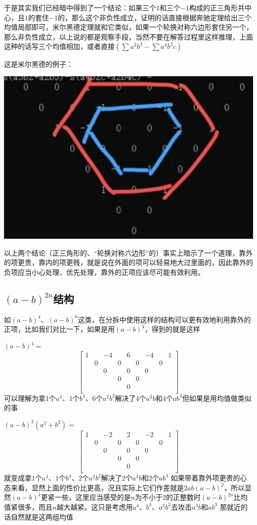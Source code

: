 \documentclass[UTF8]{ctexart}
\begin{document}
于是其实我们已经暗中得到了一个结论：如果三个$ 1 $和三个$ -1 $构成的正三角形共中心，且$ 1 $的套住$ -1 $的，那么这个非负性成立，证明的话直接根据奔驰定理给出三个均值局部即可，米尔黑德定理就和它类似，如果一个轮换对称六边形套住另一个，那么非负性成立，以上说的都是观察手段，当然不要在解答过程里这样推理，上面这种的话写三个均值相加，或者直接$ (\displaystyle \sum a^{2}b^{2}-\displaystyle \sum a^{4}b^{2}c) $

这是米尔黑德的例子：
\begin{center}
	\includegraphics[width=0.45\linewidth]{160}
\end{center}
以上两个结论（正三角形的、“轮换对称六边形”的）事实上暗示了一个道理，靠外的项更贵，靠内的项更贱，就是说在外面的项可以轻易地大过里面的，因此靠外的负项应当小心处理、优先处理，靠外的正项应该尽可能有效利用。\\

\subsection{$ (a-b)^{2n} $结构}

如$ (a-b)^{4} $、$ (a-b)^{6} $这类，在分拆中使用这样的结构可以更有效地利用靠外的正项，比如我们对比一下，如果是用$ (a-b)^{4} $，得到的就是这样

$ (a-b)^{4}= $
\renewcommand*{\arraystretch}{1.732}\[\left[\begin{matrix}
	1& &-4& &6& &-4& &1\\
	&0& &0& &0& &0&\\
	& &0& &0& &0& &\\
	& & &0& &0& & &\\
	& & & &0& & & &\\
\end{matrix}\right]\]
可以理解为拿1个$ a^{4} $、1个$ b^{4} $、6个$ a^{2}b^{2} $解决了4个$ a^{3}b $和4个$ ab^{3} $但如果是用均值做类似的事

$ (a-b)^{2}(a^{2}+b^{2})= $
\renewcommand*{\arraystretch}{1.732}\[\left[\begin{matrix}
	1& &-2& &2& &-2& &1\\
	&0& &0& &0& &0&\\
	& &0& &0& &0& &\\
	& & &0& &0& & &\\
	& & & &0& & & &\\
\end{matrix}\right]\]
就变成拿$ 1 $个$ a^{4} $、$ 1 $个$ b^{4} $、$ 2 $个$ a^{2}b^{2} $解决了$ 2 $个$ a^{3}b $和2个$ ab^{3} $
如果带着靠外项更贵的心态来看，显然上面的性价比更高，况且实际上它们作差就是$ 2ab(a-b)^{2} $，所以显然$ (a-b)^{4} $更紧一些，这里应当感受的是$ n $为不小于$ 2 $的正整数时$ (a-b)^{2n} $比均值紧很多，而且$ n $越大越紧。这只是考虑用$ a^{4} $、$ b^{4} $、$ a^{2}b^{2} $去攻击$ a^{3}b $和$ ab^{3} $
那就近的话自然就是这两组均值\\
\end{document}
